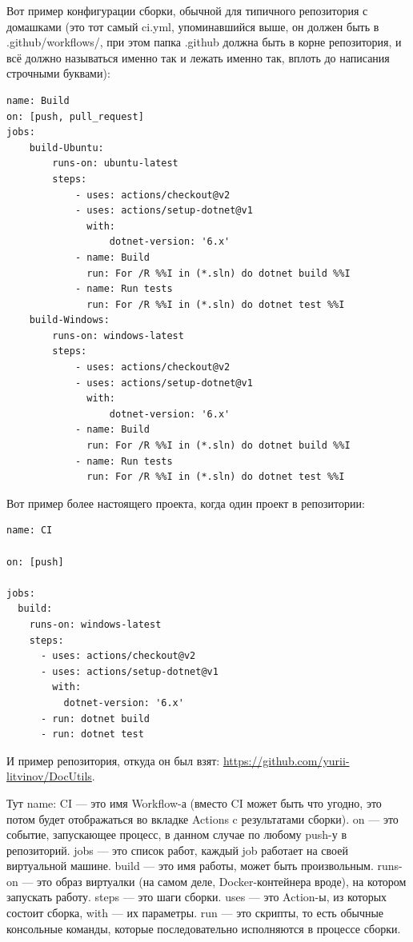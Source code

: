 \documentclass[a5paper]{article}
\begin{document}
Вот пример конфигурации сборки, обычной для типичного репозитория с домашками (это тот самый ci.yml, упоминавшийся выше, он должен быть в .github/workflows/, при этом папка .github должна быть в корне репозитория, и всё должно называться именно так и лежать именно так, вплоть до написания строчными буквами):

\begin{verbatim}
name: Build
on: [push, pull_request]
jobs:
    build-Ubuntu:
        runs-on: ubuntu-latest
        steps:
            - uses: actions/checkout@v2
            - uses: actions/setup-dotnet@v1
              with:
                  dotnet-version: '6.x'
            - name: Build
              run: For /R %%I in (*.sln) do dotnet build %%I
            - name: Run tests
              run: For /R %%I in (*.sln) do dotnet test %%I
    build-Windows:
        runs-on: windows-latest
        steps:
            - uses: actions/checkout@v2
            - uses: actions/setup-dotnet@v1
              with:
                  dotnet-version: '6.x'
            - name: Build
              run: For /R %%I in (*.sln) do dotnet build %%I
            - name: Run tests
              run: For /R %%I in (*.sln) do dotnet test %%I
\end{verbatim}

Вот пример более настоящего проекта, когда один проект в репозитории:

\begin{verbatim}
name: CI

on: [push]

jobs:
  build:
    runs-on: windows-latest
    steps:
      - uses: actions/checkout@v2
      - uses: actions/setup-dotnet@v1
        with:
          dotnet-version: '6.x' 
      - run: dotnet build 
      - run: dotnet test
\end{verbatim}

И пример репозитория, откуда он был взят: \url{https://github.com/yurii-litvinov/DocUtils}.

Тут name: CI --- это имя Workflow-а (вместо CI может быть что угодно, это потом будет отображаться во вкладке Actions c результатами сборки). on --- это событие, запускающее процесс, в данном случае по любому push-у в репозиторий. jobs --- это список работ, каждый job работает на своей виртуальной машине. build --- это имя работы, может быть произвольным. runs-on --- это образ виртуалки (на самом деле, Docker-контейнера вроде), на котором запускать работу. steps --- это шаги сборки. uses --- это Action-ы, из которых состоит сборка, with --- их параметры. run --- это скрипты, то есть обычные консольные команды, которые последовательно исполняются в процессе сборки.
\end{document}
